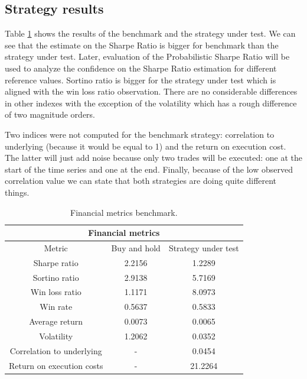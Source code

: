 \subsection{Strategy results}
\label{sec:results_strategy}

Table \ref{table:financial_metrics} shows the results of the benchmark and the
strategy under test. We can see that the estimate on the Sharpe Ratio is bigger
for benchmark than the strategy under test. Later, evaluation of the
Probabilistic Sharpe Ratio will be used to analyze the confidence on the Sharpe
Ratio estimation for different reference values. Sortino ratio is bigger for the
strategy under test which is aligned with the win loss ratio observation. There
are no considerable differences in other indexes with the exception of the
volatility which has a rough difference of two magnitude orders.

Two indices were not computed for the benchmark strategy: correlation to
underlying (because it would be equal to 1) and the return on execution cost.
The latter will just add noise because only two trades will be executed: one at
the start of the time series and one at the end. Finally, because of the low
observed correlation value we can state that both strategies are doing quite
different things.

\begin{table}[H]
  \centering
  \begin{tabular}{| c | c | c |} 
    \hline
    \multicolumn{3}{|c|}{Financial metrics} \\
    \hline
    Metric & Buy and hold & Strategy under test \\
    \hline
    Sharpe ratio & 2.2156 & 1.2289 \\
    \hline
    Sortino ratio & 2.9138 & 5.7169 \\
    \hline
    Win loss ratio & 1.1171 & 8.0973 \\
    \hline
    Win rate & 0.5637 & 0.5833 \\
    \hline
    Average return & 0.0073 & 0.0065 \\
    \hline 
    Volatility & 1.2062 & 0.0352 \\
    \hline
    Correlation to underlying &  - & 0.0454 \\
    \hline
    Return on execution costs & - & 21.2264 \\
    \hline
  \end{tabular}
  \caption{Financial metrics benchmark.}
  \label{table:financial_metrics}
\end{table}


